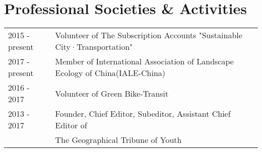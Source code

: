 \section*{Professional Societies \& Activities}

\begin{tabular}{ll}
2015 - present & Volunteer of The Subscription Accounts "Sustainable City·Transportation" \\
2017 - present & Member of International Association of Landscape Ecology of China(IALE-China) \\
2016 - 2017 & Volunteer of Green Bike-Transit \\
2013 - 2017 & Founder, Chief Editor, Subeditor, Assistant Chief Editor of \\ 
& The Geographical Tribune of Youth \\
\end{tabular}
